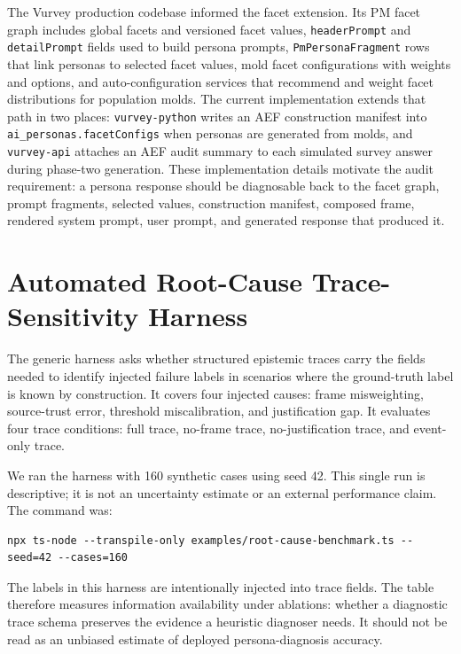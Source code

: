 \documentclass[10pt,a4paper]{article}
\begin{document}
The Vurvey production codebase informed the facet extension. Its PM facet graph includes global facets and versioned facet values, \texttt{headerPrompt} and \texttt{detailPrompt} fields used to build persona prompts, \texttt{PmPersonaFragment} rows that link personas to selected facet values, mold facet configurations with weights and options, and auto-configuration services that recommend and weight facet distributions for population molds. The current implementation extends that path in two places: \texttt{vurvey-python} writes an AEF construction manifest into \texttt{ai\_personas.facetConfigs} when personas are generated from molds, and \texttt{vurvey-api} attaches an AEF audit summary to each simulated survey answer during phase-two generation. These implementation details motivate the audit requirement: a persona response should be diagnosable back to the facet graph, prompt fragments, selected values, construction manifest, composed frame, rendered system prompt, user prompt, and generated response that produced it.

\section{Automated Root-Cause Trace-Sensitivity Harness}
The generic harness asks whether structured epistemic traces carry the fields needed to identify injected failure labels in scenarios where the ground-truth label is known by construction. It covers four injected causes: frame misweighting, source-trust error, threshold miscalibration, and justification gap. It evaluates four trace conditions: full trace, no-frame trace, no-justification trace, and event-only trace.

We ran the harness with 160 synthetic cases using seed 42. This single run is descriptive; it is not an uncertainty estimate or an external performance claim. The command was:
\begin{verbatim}
npx ts-node --transpile-only examples/root-cause-benchmark.ts --seed=42 --cases=160
\end{verbatim}

The labels in this harness are intentionally injected into trace fields. The table therefore measures information availability under ablations: whether a diagnostic trace schema preserves the evidence a heuristic diagnoser needs. It should not be read as an unbiased estimate of deployed persona-diagnosis accuracy.
\end{document}
